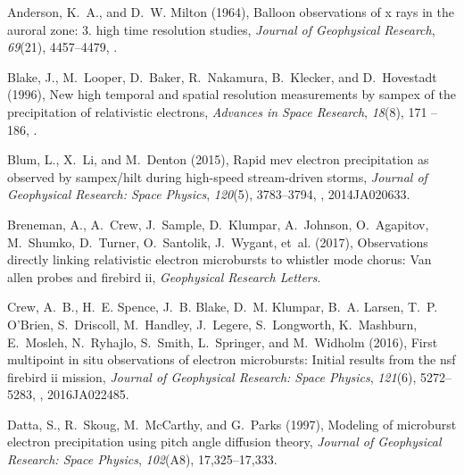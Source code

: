 \documentclass[draft, linenumbers]{agujournal}
\begin{document}
\begin{thebibliography}{35}
Anderson, K.~A., and D.~W. Milton (1964), Balloon observations of x rays in the
  auroral zone: 3. high time resolution studies, \textit{Journal of Geophysical
  Research}, \textit{69}(21), 4457--4479, .

Blake, J., M.~Looper, D.~Baker, R.~Nakamura, B.~Klecker, and D.~Hovestadt
  (1996), New high temporal and spatial resolution measurements by sampex of
  the precipitation of relativistic electrons, \textit{Advances in Space
  Research}, \textit{18}(8), 171 -- 186,
  .

Blum, L., X.~Li, and M.~Denton (2015), Rapid mev electron precipitation as
  observed by sampex/hilt during high-speed stream-driven storms,
  \textit{Journal of Geophysical Research: Space Physics}, \textit{120}(5),
  3783--3794, , 2014JA020633.

Breneman, A., A.~Crew, J.~Sample, D.~Klumpar, A.~Johnson, O.~Agapitov,
  M.~Shumko, D.~Turner, O.~Santolik, J.~Wygant, et~al. (2017), Observations
  directly linking relativistic electron microbursts to whistler mode chorus:
  Van allen probes and firebird ii, \textit{Geophysical Research Letters}.

Crew, A.~B., H.~E. Spence, J.~B. Blake, D.~M. Klumpar, B.~A. Larsen, T.~P.
  O'Brien, S.~Driscoll, M.~Handley, J.~Legere, S.~Longworth, K.~Mashburn,
  E.~Mosleh, N.~Ryhajlo, S.~Smith, L.~Springer, and M.~Widholm (2016), First
  multipoint in situ observations of electron microbursts: Initial results from
  the nsf firebird ii mission, \textit{Journal of Geophysical Research: Space
  Physics}, \textit{121}(6), 5272--5283, ,
  2016JA022485.

Datta, S., R.~Skoug, M.~McCarthy, and G.~Parks (1997), Modeling of microburst
  electron precipitation using pitch angle diffusion theory, \textit{Journal of
  Geophysical Research: Space Physics}, \textit{102}(A8), 17,325--17,333.


\end{thebibliography}
\end{document}

